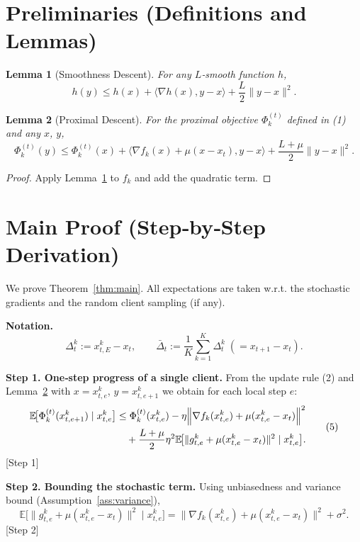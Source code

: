 \documentclass{article}
\newtheorem{lemma}{Lemma}
\newcommand{\EE}{\mathbb{E}}
\newcommand{\prox}{\mu}
\begin{document}
\newpage
\section*{Preliminaries (Definitions and Lemmas)}
\begin{lemma}[Smoothness Descent]\label{lem:smooth}
For any $L$‑smooth function $h$,
\[
h(y)\le h(x)+\langle\nabla h(x),y-x\rangle
+\frac{L}{2}\|y-x\|^2 .
\]
\end{lemma}
\begin{lemma}[Proximal Descent]\label{lem:prox}
For the proximal objective $\Phi_k^{(t)}$ defined in (1) and any
$x$, $y$,
\[
\Phi_k^{(t)}(y)\le\Phi_k^{(t)}(x)+\langle\nabla f_k(x)+\prox(x-x_t),y-x\rangle
+\frac{L+\prox}{2}\|y-x\|^2 .
\]
\end{lemma}
\begin{proof}
Apply Lemma~\ref{lem:smooth} to $f_k$ and add the quadratic term.
\end{proof}

\section*{Main Proof (Step‑by‑Step Derivation)}
We prove Theorem~\ref{thm:main}.  All expectations are taken w.r.t.
the stochastic gradients and the random client sampling (if any).  

\noindent\textbf{Notation.}
\[
\Delta_{t}^{k}:=x_{t,E}^{k}-x_t,\qquad
\bar\Delta_t:=\frac{1}{K}\sum_{k=1}^{K}\Delta_{t}^{k}
\;(=x_{t+1}-x_t).
\]

\noindent\textbf{Step 1. One‑step progress of a single client.}  
From the update rule (2) and Lemma~\ref{lem:prox} with $x=x_{t,e}^{k}$,
$y=x_{t,e+1}^{k}$ we obtain for each local step $e$:
\[
\begin{aligned}
\EE\!\bigl[\Phi_k^{(t)}(x_{t,e+1}^{k})\mid x_{t,e}^{k}\bigr]
&\le \Phi_k^{(t)}(x_{t,e}^{k})
-\eta\Bigl\|\nabla f_k(x_{t,e}^{k})+\prox(x_{t,e}^{k}-x_t)\Bigr\|^{2}\\
&\quad+\frac{L+\prox}{2}\eta^{2}
\EE\!\bigl[\|g_{t,e}^{k}+\prox(x_{t,e}^{k}-x_t)\|^{2}\mid x_{t,e}^{k}\bigr].
\end{aligned}
\tag{5}
\] 
[Step 1]

\noindent\textbf{Step 2. Bounding the stochastic term.}
Using unbiasedness and variance bound (Assumption~\ref{ass:variance}),
\[
\EE\!\bigl[\|g_{t,e}^{k}+\prox(x_{t,e}^{k}-x_t)\|^{2}\mid x_{t,e}^{k}\bigr]
=
\|\nabla f_k(x_{t,e}^{k})+\prox(x_{t,e}^{k}-x_t)\|^{2}
+\sigma^{2}.
\tag{6}
\] 
[Step 2]
\end{document}
